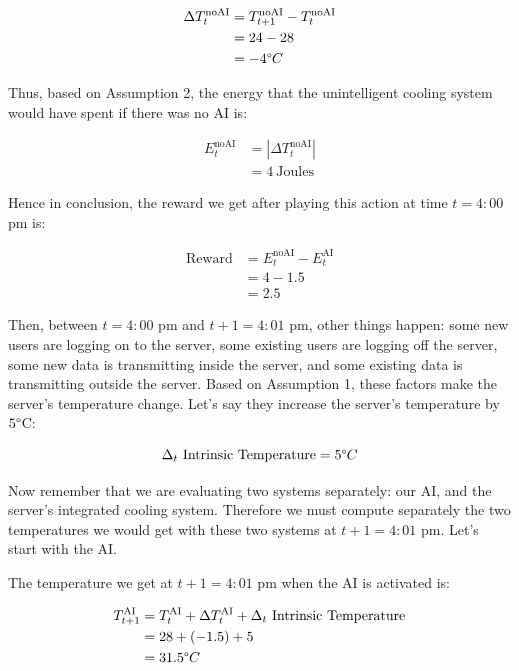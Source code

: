 \documentclass[]{book}
\begin{document}
\begin{align*}
    \Delta T_t^{\textrm{noAI}}
    & = T_{t+1}^{\textrm{noAI}} - T_t^{\textrm{noAI}} \\
    & = 24 - 28 \\
    & = -4 \degree C
\end{align*}

Thus, based on Assumption 2, the energy that the unintelligent cooling system would have spent if there was no AI is:

\begin{align*}
    E_t^{\textrm{noAI}}
    & = |\Delta T_t^{\textrm{noAI}}| \\
    & = 4 \ \textrm{Joules}
\end{align*}

Hence in conclusion, the reward we get after playing this action at time \(t = 4:00\) pm is:

\begin{align*}
    \textrm{Reward}
    & = E_t^{\textrm{noAI}} - E_t^{\textrm{AI}} \\
    & = 4 - 1.5 \\
    & = 2.5
\end{align*}

Then, between \(t = 4:00\) pm and \(t+1 = 4:01\) pm, other things happen: some new users are logging on to the server, some existing users are logging off the server, some new data is transmitting inside the server, and some existing data is transmitting outside the server. Based on Assumption 1, these factors make the server's temperature change. Let's say they increase the server's temperature by \(5 \degree\)C:

\begin{equation*}
    \Delta_t \ \textrm{Intrinsic Temperature} = 5 \degree C
\end{equation*}

Now remember that we are evaluating two systems separately: our AI, and the server's integrated cooling system. Therefore we must compute separately the two temperatures we would get with these two systems at \(t+1 = 4:01\) pm. Let's start with the AI.

The temperature we get at \(t+1 = 4:01\) pm when the AI is activated is:

\begin{align*}
    T_{t+1}^{\textrm{AI}}
    & = T_t^{\textrm{AI}} + \Delta T_t^{\textrm{AI}} + \Delta_t \ \textrm{Intrinsic Temperature} \\
    & = 28 + (-1.5) + 5 \\
    & = 31.5 \degree C
\end{align*}
\end{document}
